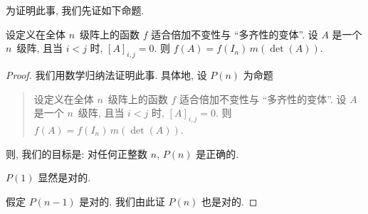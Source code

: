为证明此事, 我们先证如下命题.

\begin{theorem}
    设定义在全体 \(n\)~级阵上的函数 \(f\)
    适合倍加不变性与 ``多齐性的变体''.
    设 \(A\) 是一个 \(n\)~级阵,
    且当 \(i < j\) 时, \([A]_{i,j} = 0\).
    则 \(f(A) = f(I_n)\, m(\det {(A)})\).
\end{theorem}

\begin{proof}
    我们用数学归纳法证明此事.
    具体地, 设 \(P(n)\) 为命题
    \begin{quotation}
        设定义在全体 \(n\)~级阵上的函数 \(f\)
        适合倍加不变性与 ``多齐性的变体''.
        设 \(A\) 是一个 \(n\)~级阵,
        且当 \(i < j\) 时, \([A]_{i,j} = 0\).
        则 \(f(A) = f(I_n)\, m(\det {(A)})\).
    \end{quotation}
    则, 我们的目标是:
    对任何正整数 \(n\), \(P(n)\) 是正确的.

    \(P(1)\) 显然是对的.

    假定 \(P(n-1)\) 是对的.
    我们由此证 \(P(n)\) 也是对的.


\end{proof}
